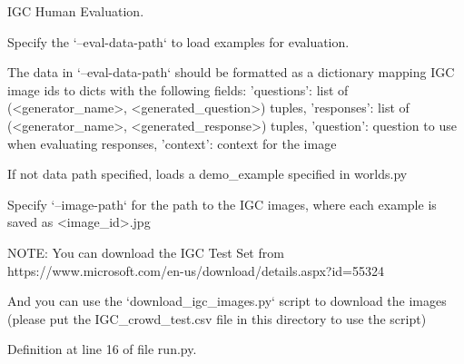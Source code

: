 \begin{DoxyVerb}IGC Human Evaluation.

Specify the `--eval-data-path` to load examples for evaluation.

The data in `--eval-data-path` should be formatted as a dictionary
mapping IGC image ids to dicts with the following fields:
{
    'questions': list of (<generator_name>, <generated_question>) tuples,
    'responses': list of (<generator_name>, <generated_response>) tuples,
    'question': question to use when evaluating responses,
    'context': context for the image
}

If not data path specified, loads a demo_example specified in worlds.py

Specify `--image-path` for the path to the IGC images, where each example
is saved as <image_id>.jpg


NOTE: You can download the IGC Test Set from
    https://www.microsoft.com/en-us/download/details.aspx?id=55324

And you can use the `download_igc_images.py` script to download the images
(please put the IGC_crowd_test.csv file in this directory to use the script)
\end{DoxyVerb}
 

Definition at line 16 of file run.\+py.


